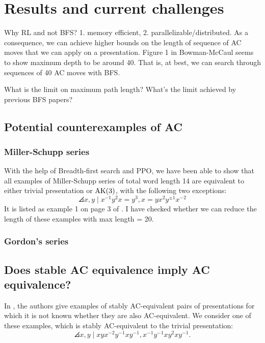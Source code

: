 
\section{Results and current challenges}

Why RL and not BFS? 1. memory efficient, 2. parallelizable/distributed.
As a consequence,  we can achieve higher bounds on the length of sequence of AC moves that we can apply on a presentation.
Figure 1 in Bowman-McCaul seems to show maximum depth to be around 40.
That is, at best, we can search through sequences of 40 AC moves with BFS.

What is the limit on maximum path length? What's the limit achieved by previous BFS papers?

\subsection{Potential counterexamples of AC}

\subsubsection{Miller-Schupp series}

With the help of Breadth-first search and PPO, we have been able to show that all examples of Miller-Schupp series of total word length 14 are equivalent to either trivial presentation or $\text{AK}(3)$, with the following two exceptions:
\[
\angles{x, y \mid x^{-1} y^2 x = y^{3} , x = y x^2 y^{\pm 1} x^{-2}}
\]
It is listed as example 1 on page 3 of \cite{MMS}.
I have checked whether we can reduce the length of these examples with max length = 20.


\subsubsection{Gordon's series}

\subsection{Does stable AC equivalence imply AC equivalence?}

In \cite{MMS}, the authors give examples of stably AC-equivalent pairs of presentations for which it is not known whether they are also AC-equivalent.
We consider one of these examples, which is stably AC-equivalent to the trivial presentation:
\[
\angles{x, y \mid xyx^{-2}y^{-1} xy^{-1}, x^{-1} y^{-1} x y^2 x y^{-1}}.
\]

